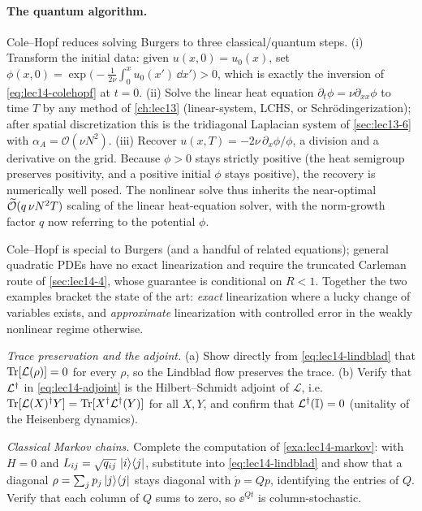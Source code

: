 \paragraph{The quantum algorithm.}
Cole--Hopf reduces solving Burgers to three classical/quantum steps. (i) Transform the initial
data: given $u(x,0)=u_0(x)$, set $\phi(x,0)=\exp\bigl(-\tfrac1{2\nu}\int_0^x u_0(x')\,\dd x'\bigr)
>0$, which is exactly the inversion of \eqref{eq:lec14-colehopf} at $t=0$. (ii) Solve the linear
heat equation $\partial_t\phi=\nu\partial_{xx}\phi$ to time $T$ by any method of \cref{ch:lec13}
(linear-system, LCHS, or Schr\"odingerization); after spatial discretization this is the
tridiagonal Laplacian system of \cref{sec:lec13-6} with $\alpha_A=\mathcal O(\nu N^2)$. (iii)
Recover $u(x,T)=-2\nu\,\partial_x\phi/\phi$, a division and a derivative on the grid. Because
$\phi>0$ stays strictly positive (the heat semigroup preserves positivity, and a positive initial
$\phi$ stays positive), the recovery is numerically well posed. The nonlinear solve thus inherits
the near-optimal $\widetilde{\mathcal{O}}(q\,\nu N^2 T)$ scaling of the linear heat-equation solver, with
the norm-growth factor $q$ now referring to the potential $\phi$.

\begin{remark}[Scope]
\label{rem:lec14-scope}
Cole--Hopf is special to Burgers (and a handful of related equations); general quadratic PDEs
have no exact linearization and require the truncated Carleman route of \cref{sec:lec14-4}, whose
guarantee is conditional on $R<1$. Together the two examples bracket the state of the art:
\emph{exact} linearization where a lucky change of variables exists, and \emph{approximate}
linearization with controlled error in the weakly nonlinear regime otherwise.
\end{remark}

\exercisesection

\begin{exercise}\label{ex:lec14-1}
\emph{Trace preservation and the adjoint.} (a) Show directly from \eqref{eq:lec14-lindblad} that
$\operatorname{Tr}[\mathcal L(\rho)]=0$ for every $\rho$, so the Lindblad flow preserves the trace. (b) Verify
that $\mathcal L^{\dagger}$ in \eqref{eq:lec14-adjoint} is the Hilbert--Schmidt adjoint of $\mathcal L$,
i.e.\ $\operatorname{Tr}[\mathcal L(X)^{\dagger} Y]=\operatorname{Tr}[X^{\dagger}\mathcal L^{\dagger}(Y)]$ for all $X,Y$, and confirm that
$\mathcal L^{\dagger}(\mathbb{I})=0$ (unitality of the Heisenberg dynamics).
\end{exercise}

\begin{exercise}\label{ex:lec14-2}
\emph{Classical Markov chains.} Complete the computation of \cref{exa:lec14-markov}: with $H=0$
and $L_{ij}=\sqrt{q_{ij}}\,\ket i\!\bra j$, substitute into \eqref{eq:lec14-lindblad} and show
that a diagonal $\rho=\sum_j p_j\ket{j}\!\bra{j}$ stays diagonal with $\dot p=Qp$, identifying the entries
of $Q$. Verify that each column of $Q$ sums to zero, so $\ee^{Qt}$ is column-stochastic.
\end{exercise}


